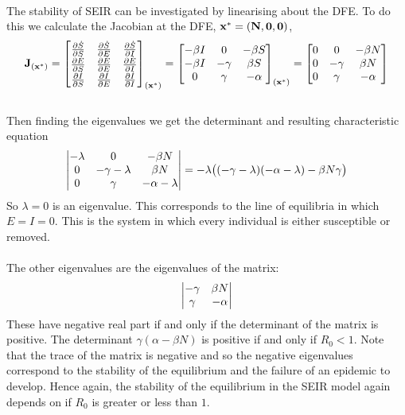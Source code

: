 \\
The stability of SEIR can be investigated by linearising about the DFE. To do this we calculate the Jacobian at the DFE, $\bf{x}^*=(N,0,0)$,\\
\[
\bf{J}_{(\bf{x}^*)}=
{\begin{bmatrix}
	{\partial \dot S \over \partial S} &
	{\partial \dot S \over \partial E} &
	{\partial \dot S \over \partial I} \cr 
	{\partial \dot E \over \partial S} & 
	{\partial \dot E \over \partial E} & 
	{\partial \dot E \over \partial I} \cr 
	{\partial \dot I \over \partial S} & 
	{\partial \dot I \over \partial E} & 
	{\partial \dot I \over \partial I}
\end{bmatrix}}
_{(\bf{x}^*)}
={\begin{bmatrix}
	{-\beta I} &
	{0} &
	{-\beta S} \cr 
	{-\beta I} & 
	{-\gamma} & 
	{\beta S} \cr 
	{0} & 
	{\gamma} & 
	{-\alpha}
	\end{bmatrix}}
_{(\bf{x}^*)}
={\begin{bmatrix}
	{0} &
	{0} &
	{-\beta N} \cr 
	{0} & 
	{-\gamma} & 
	{\beta N} \cr 
	{0} & 
	{\gamma} & 
	{-\alpha}
	\end{bmatrix}}
\]
\\
Then finding the eigenvalues we get the determinant and resulting characteristic equation
\[{\begin{vmatrix}
	{-\lambda} &
	{0} &
	{-\beta N} \cr 
	{0} & 
	{-\gamma-\lambda} & 
	{\beta N} \cr 
	{0} & 
	{\gamma} & 
	{-\alpha-\lambda}
	\end{vmatrix}}=-\lambda\big((-\gamma-\lambda)(-\alpha-\lambda)-\beta N\gamma \big)\]
So $\lambda=0$ is an eigenvalue. This corresponds to the line of equilibria in which $E=I=0$. This is the system in which every individual is either susceptible or removed.\label{mmd}\\
\\
The other eigenvalues are the eigenvalues of the matrix:
\[{\begin{vmatrix}
	{-\gamma} & 
	{\beta N} \cr 
	{\gamma} & 
	{-\alpha}
	\end{vmatrix}}\]
These have negative real part if and only if the determinant of the matrix is positive\cite{models-epidemiology-2}. The determinant $\gamma(\alpha-\beta N)$ is positive if and only if $R_0<1$. Note that the trace of the matrix is negative and so the negative eigenvalues correspond to the stability of the equilibrium and the failure of an epidemic to develop\cite{models-epidemiology-2}. Hence again, the stability of the equilibrium in the SEIR model again depends on if $R_0$ is greater or less than $1$.

